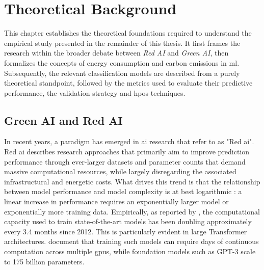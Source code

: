 \chapter{Theoretical Background}
\label{theoretical_background}

This chapter establishes the theoretical foundations required to understand the empirical study presented in the remainder of this thesis. It first frames the research within the broader debate between \textit{Red AI} and \textit{Green AI}, then formalizes the concepts of energy consumption and carbon emissions in \gls{ml}. Subsequently, the relevant classification models are described from a purely theoretical standpoint, followed by the metrics used to evaluate their predictive performance, the validation strategy and \glspl{hpo} techniques.


\section{Green AI and Red AI}
\label{sec:theoretical_green_red_ai}

In recent years, a paradigm has emerged in \gls{ai} research that \citeauthor{schwartzGreenAI2020} \parencite{schwartzGreenAI2020} refer to as "Red \gls{ai}". Red \gls{ai} describes research approaches that primarily aim to improve prediction performance through ever-larger datasets and parameter counts that demand massive computational resources, while largely disregarding the associated infrastructural and energetic costs. What drives this trend is that the relationship between model performance and model complexity is at best logarithmic \parencite{schwartzGreenAI2020}: a linear increase in performance requires an exponentially larger model or exponentially more training data. Empirically, as reported by \citeauthor{verdecchiaDataCentricGreenAI2022a} \parencite{verdecchiaDataCentricGreenAI2022a}, the computational capacity used to train state-of-the-art models has been doubling approximately every 3.4 months since 2012. This is particularly evident in large Transformer architectures. \citeauthor{strubellEnergyPolicyConsiderations2019a} \parencite{strubellEnergyPolicyConsiderations2019a} document that training such models can require days of continuous computation across multiple \glspl{gpu}, while foundation models such as GPT-3 scale to 175 billion parameters.

